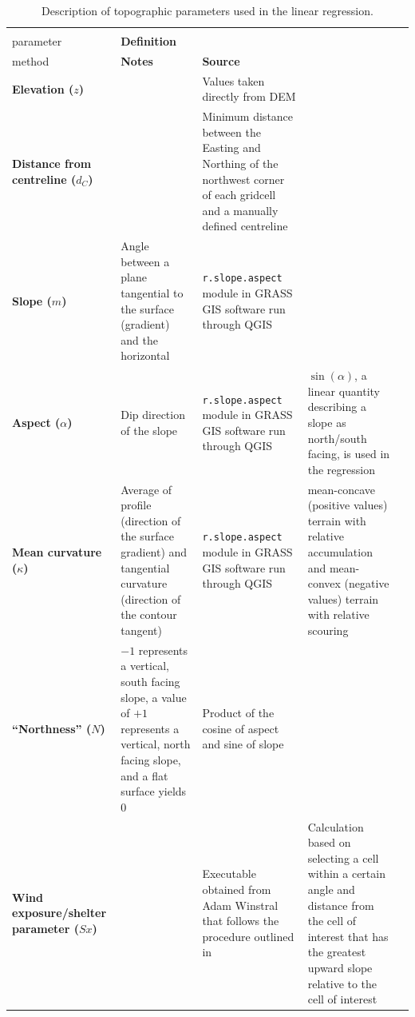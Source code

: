 \documentclass[twocolumn, letterpaper]{igs}
\begin{document}
\begin{table}[!htbp]
\centering%
\caption{Description of topographic parameters used in the linear regression.}
\label{tab:TopoParams}
\begin{tabularx}{\linewidth}{XXXXX}
\midrule
\textbf{\begin{tabular}[c]{@{}l@{}}Topographic\\ parameter\end{tabular}} & \textbf{Definition} & \textbf{\begin{tabular}[c]{@{}l@{}}Calculation \\ method\end{tabular}} & \textbf{Notes} & \textbf{Source} \\ \midrule
\textbf{Elevation ($z$)} &  & Values taken directly from DEM &  &  \\
\textbf{Distance from centreline ($d_C$)} &  & Minimum distance between the Easting and Northing of the northwest corner of each gridcell and a manually defined centreline &  &  \\
\textbf{Slope ($m$)} & Angle between a plane tangential to the surface (gradient) and the horizontal & \texttt{r.slope.aspect} module in GRASS GIS software run through QGIS &  & \cite{Mitavsova1993, Hofierka2009, Olaya2009} \\
\textbf{Aspect ($\alpha$)} & Dip direction of the slope & \texttt{r.slope.aspect} module in GRASS GIS software run through QGIS & $\sin(\alpha)$, a linear quantity describing a slope as north/south facing, is used in the regression & \cite{Mitavsova1993, Hofierka2009, Olaya2009} \\
\textbf{Mean curvature ($\kappa$)} & Average of profile (direction of the surface gradient) and tangential curvature (direction of the contour tangent) & \texttt{r.slope.aspect} module in GRASS GIS software run through QGIS & mean-concave (positive values) terrain with relative accumulation and mean-convex (negative values) terrain with relative scouring & \cite{Mitavsova1993, Hofierka2009, Olaya2009} \\
\textbf{``Northness'' ($N$)} & $-1$ represents a vertical, south facing slope, a value of $+1$ represents a vertical, north facing slope, and a flat surface yields 0 & Product of the cosine of aspect and sine of slope &  & \cite{Molotch2005} \\
\textbf{Wind exposure/shelter parameter ($Sx$)} &  & Executable obtained from Adam Winstral that follows the procedure outlined in \cite{Winstral2002} & Calculation based on selecting a cell within a certain angle and distance from the cell of interest that has the greatest upward slope relative to the cell of interest & \cite{Winstral2002}
\end{tabularx}
\end{table}
\end{document}
